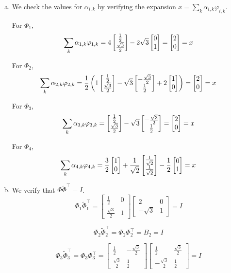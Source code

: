 \begin{enumerate}[(a)]
\item We check the values for $\alpha_{i,k}$ by verifying the expansion $x = \sum_k \alpha_{i,k} \varphi_{i,k}.$

For $\Phi_1$,
\[\sum_{k} \alpha_{1,k}\varphi_{1,k} = 4\begin{bmatrix} \frac{1}{2} \\ \frac{\sqrt{3}}{2} \end{bmatrix} - 2\sqrt{3}\begin{bmatrix} 0 \\ 1 \end{bmatrix} = \begin{bmatrix} 2 \\ 0 \end{bmatrix} = x\]

For $\Phi_2$,
\[\sum_{k} \alpha_{2,k}\varphi_{2,k} = \frac{1}{2}\left(1\begin{bmatrix} \frac{1}{2}\\\frac{\sqrt{3}}{2} \end{bmatrix} -\sqrt{3}\begin{bmatrix} -\frac{\sqrt{3}}{2} \\ \frac{1}{2} \end{bmatrix} +2\begin{bmatrix} 1 \\ 0 \end{bmatrix}\right) = \begin{bmatrix} 2\\0 \end{bmatrix} = x\]

For $\Phi_3$,
\[\sum_{k} \alpha_{3,k}\varphi_{3,k} = \begin{bmatrix} \frac{1}{2} \\ \frac{\sqrt{3}}{2} \end{bmatrix} - \sqrt{3}\begin{bmatrix} -\frac{\sqrt{3}}{2} \\ \frac{1}{2} \end{bmatrix} = \begin{bmatrix} 2 \\ 0 \end{bmatrix} = x\]

For $\Phi_4$,
\[\sum_{k} \alpha_{4,k}\varphi_{4,k} = \frac{3}{2}\begin{bmatrix} 1 \\ 0 \end{bmatrix} + \frac{1}{\sqrt{2}}\begin{bmatrix} \frac{1}{\sqrt{2}}\\\frac{1}{\sqrt{2}} \end{bmatrix} -\frac{1}{2}\begin{bmatrix} 0\\1 \end{bmatrix} = x\]

\item We verify that $\Phi \tilde{\Phi}^\top = I$.
\[\Phi_1 \tilde{\Phi}_1^\top = \begin{bmatrix}\frac{1}{2} & 0\\\frac{\sqrt{3}}{2} & 1\end{bmatrix}\begin{bmatrix}2 & 0 \\ -\sqrt{3} & 1\end{bmatrix} = I\]

\[\Phi_2 \tilde{\Phi}_2^\top = \Phi_2 \Phi_2^\top = B_2 = I\]

\[\Phi_3 \tilde{\Phi}_3^\top = \Phi_3 \Phi_3^\top = \begin{bmatrix}\frac{1}{2} & -\frac{\sqrt{3}}{2} \\ \frac{\sqrt{3}}{2} & \frac{1}{2}\end{bmatrix} \begin{bmatrix}\frac{1}{2} & \frac{\sqrt{3}}{2} \\ -\frac{\sqrt{3}}{2} & \frac{1}{2}\end{bmatrix} = I\]


\end{enumerate}
